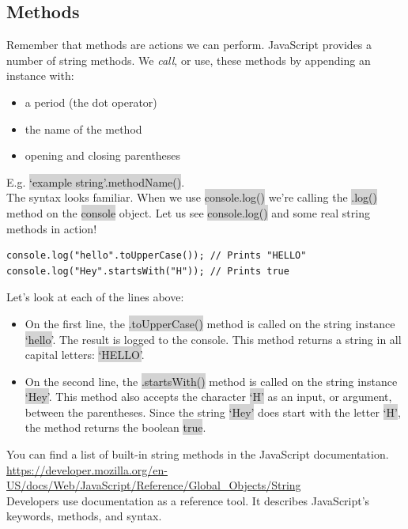 \documentclass[11pt]{article}
\begin{document}
\subsection{Methods}
Remember that methods are actions we can perform. JavaScript provides a number of string methods. We \textit{call}, or use, these methods by appending an instance with:
\begin{itemize}[leftmargin = *]
\item a period (the dot operator)
\item the name of the method
\item opening and closing parentheses
\end{itemize}
E.g. \colorbox{lightgray}{`example string'.methodName()}. \\
The syntax looks familiar. When we use \colorbox{lightgray}{console.log()} we’re calling the \colorbox{lightgray}{.log()} method on the \colorbox{lightgray}{console} object. Let us see \colorbox{lightgray}{console.log()} and some real string methods in action!
\begin{lstlisting}
console.log("hello".toUpperCase()); // Prints "HELLO"
console.log("Hey".startsWith("H")); // Prints true
\end{lstlisting}
Let’s look at each of the lines above: 
\begin{itemize}[leftmargin = *]
\item On the first line, the \colorbox{lightgray}{.toUpperCase()} method is called on the string instance \colorbox{lightgray}{`hello'}. The result is logged to the console. This method returns a string in all capital letters: \colorbox{lightgray}{`HELLO'}.
\item On the second line, the \colorbox{lightgray}{.startsWith()} method is called on the string instance \colorbox{lightgray}{`Hey'}. This method also accepts the character \colorbox{lightgray}{`H'} as an input, or argument, between the parentheses. Since the string \colorbox{lightgray}{`Hey'} does start with the letter \colorbox{lightgray}{`H'}, the method returns the boolean \colorbox{lightgray}{true}.
\end{itemize}
You can find a list of built-in string methods in the JavaScript documentation. \\
\underline{https://developer.mozilla.org/en-US/docs/Web/JavaScript/Reference/Global\_Objects/String}\\
Developers use documentation as a reference tool. It describes JavaScript’s keywords, methods, and syntax.
\end{document}
